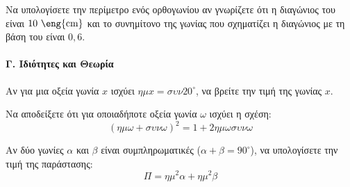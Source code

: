 \documentclass[11pt,a4paper,modern]{FFExercises}
\begin{document}
\askhsh
Να υπολογίσετε την περίμετρο ενός ορθογωνίου αν γνωρίζετε ότι η διαγώνιος του είναι $10\text{ \eng{cm}}$ και το συνημίτονο της γωνίας που σχηματίζει η διαγώνιος με τη βάση του είναι $0,6$.

\paragraph{Γ. Ιδιότητες και Θεωρία}

\askhsh
Αν για μια οξεία γωνία $x$ ισχύει $\eta\mu x = \sigma\upsilon\nu 20^\circ$, να βρείτε την τιμή της γωνίας $x$.

\askhsh
Να αποδείξετε ότι για οποιαδήποτε οξεία γωνία $\omega$ ισχύει η σχέση:
\[ (\eta\mu \omega + \sigma\upsilon\nu \omega)^2 = 1 + 2 \eta\mu \omega \sigma\upsilon\nu \omega \]

\askhsh
Αν δύο γωνίες $\alpha$ και $\beta$ είναι συμπληρωματικές ($\alpha + \beta = 90^\circ$), να υπολογίσετε την τιμή της παράστασης:
\[ \Pi = \eta\mu^2 \alpha + \eta\mu^2 \beta \]
\end{document}
